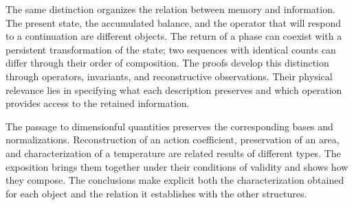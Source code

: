 The same distinction organizes the relation between memory and
information. The present state, the accumulated balance, and the operator
that will respond to a continuation are different objects. The return of
a phase can coexist with a persistent transformation of the state; two
sequences with identical counts can differ through their order of
composition. The proofs develop this distinction through operators,
invariants, and reconstructive observations. Their physical relevance
lies in specifying what each description preserves and which operation
provides access to the retained information.

The passage to dimensionful quantities preserves the corresponding bases
and normalizations. Reconstruction of an action coefficient, preservation
of an area, and characterization of a temperature are related results of
different types. The exposition brings them together under their
conditions of validity and shows how they compose. The conclusions make
explicit both the characterization obtained for each object and the
relation it establishes with the other structures.
